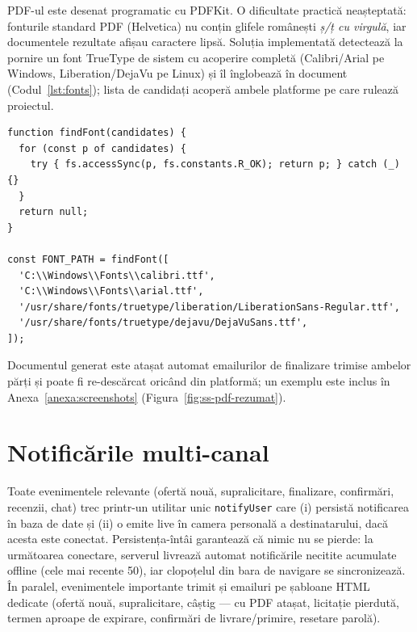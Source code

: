 PDF-ul este desenat programatic cu PDFKit. O dificultate practică neașteptată: fonturile standard PDF (Helvetica) nu conțin glifele românești \textit{ș/ț cu virgulă}, iar documentele rezultate afișau caractere lipsă. Soluția implementată detectează la pornire un font TrueType de sistem cu acoperire completă (Calibri/Arial pe Windows, Liberation/DejaVu pe Linux) și îl înglobează în document (Codul~\ref{lst:fonts}); lista de candidați acoperă ambele platforme pe care rulează proiectul.

\begin{lstlisting}[caption={Detectarea fonturilor cu diacritice pentru PDF (server/utils/invoiceDoc.js)},label={lst:fonts}]
function findFont(candidates) {
  for (const p of candidates) {
    try { fs.accessSync(p, fs.constants.R_OK); return p; } catch (_) {}
  }
  return null;
}

const FONT_PATH = findFont([
  'C:\\Windows\\Fonts\\calibri.ttf',
  'C:\\Windows\\Fonts\\arial.ttf',
  '/usr/share/fonts/truetype/liberation/LiberationSans-Regular.ttf',
  '/usr/share/fonts/truetype/dejavu/DejaVuSans.ttf',
]);
\end{lstlisting}

Documentul generat este atașat automat emailurilor de finalizare trimise ambelor părți și poate fi re-descărcat oricând din platformă; un exemplu este inclus în Anexa~\ref{anexa:screenshots} (Figura~\ref{fig:ss-pdf-rezumat}).

\section{Notificările multi-canal}

Toate evenimentele relevante (ofertă nouă, supralicitare, finalizare, confirmări, recenzii, chat) trec printr-un utilitar unic \texttt{notifyUser} care (i) persistă notificarea în baza de date și (ii) o emite live în camera personală a destinatarului, dacă acesta este conectat. Persistența-întâi garantează că nimic nu se pierde: la următoarea conectare, serverul livrează automat notificările necitite acumulate offline (cele mai recente 50), iar clopoțelul din bara de navigare se sincronizează. În paralel, evenimentele importante trimit și emailuri pe șabloane HTML dedicate (ofertă nouă, supralicitare, câștig --- cu PDF atașat, licitație pierdută, termen aproape de expirare, confirmări de livrare/primire, resetare parolă).

